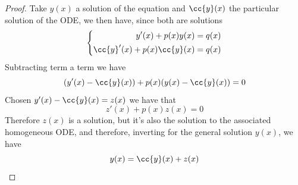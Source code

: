 \documentclass[../mmf.tex]{subfiles}
\begin{document}
\begin{proof}
	Take $y(x)$ a solution of the equation and $\cc{y}(x)$ the particular solution of the ODE, we then have, since both are solutions
	\begin{equation*}
		\left\{ \begin{aligned}
				y'(x)+p(x)y(x)&=q(x)\\
				\cc{y}'(x)+p(x)\cc{y}(x)&=q(x)
		\end{aligned}\right.
	\end{equation*}
	Subtracting term a term we have
	\begin{equation*}
		(y'(x)-\cc{y}(x))+p(x)(y(x)-\cc{y}(x))=0
	\end{equation*}
	Chosen $y'(x)-\cc{y}(x)=z(x)$ we have that
	\begin{equation*}
		z'(x)+p(x)z(x)=0
	\end{equation*}
	Therefore $z(x)$ is a solution, but it's also the solution to the associated homogeneous ODE, and therefore, inverting for the general solution $y(x)$, we have
	\begin{equation*}
		y(x)=\cc{y}(x)+z(x)
	\end{equation*}
\end{proof}
\end{document}
